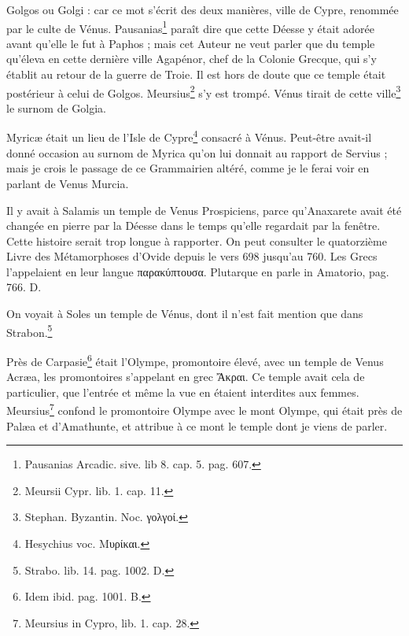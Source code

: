 \documentclass[a4paper, 18pt, oneside]{article}
\begin{document}
Golgos ou Golgi : car ce mot s'écrit des deux manières, ville de Cypre, renommée par le culte de Vénus. Pausanias\footnote{Pausanias Arcadic. sive. lib 8. cap. 5. pag. 607.} paraît dire que cette Déesse y était adorée avant qu'elle le fut à Paphos ; mais cet Auteur ne veut parler que du temple qu'éleva en cette dernière ville Agapénor, chef de la Colonie Grecque, qui s'y établit au retour de la guerre de Troie. Il est hors de doute que ce temple était postérieur à celui de Golgos. Meursius\footnote{Meursii Cypr. lib. 1. cap. 11.} s'y est trompé. Vénus tirait de cette ville\footnote{Stephan. Byzantin. Noc. γολγοί.} le surnom de Golgia.

Myricæ était un lieu de l'Isle de Cypre\footnote{Hesychius voc. Μυρίκαι.} consacré à Vénus. Peut-être avait-il donné occasion au surnom de Myrica qu'on lui donnait au rapport de Servius ; mais je crois le passage de ce Grammairien altéré, comme je le ferai voir en parlant de Venus Murcia.

Il y avait à Salamis un temple de Venus Prospiciens, parce qu'Anaxarete avait été changée en pierre par la Déesse dans le temps qu'elle regardait par la fenêtre. Cette histoire serait trop longue à rapporter. On peut consulter le quatorzième Livre des Métamorphoses d'Ovide depuis le vers 698 jusqu'au 760. Les Grecs l'appelaient en leur langue παρακύπτουσα. Plutarque en parle in Amatorio, pag. 766. D.

On voyait à Soles un temple de Vénus, dont il n'est fait mention que dans Strabon.\footnote{Strabo. lib. 14. pag. 1002. D.}

Près de Carpasie\footnote{Idem ibid. pag. 1001. B.} était l'Olympe, promontoire élevé, avec un temple de Venus Acræa, les promontoires s'appelant en grec Ἄκραι. Ce temple avait cela de particulier, que l'entrée et même la vue en étaient interdites aux femmes. Meursius\footnote{Meursius in Cypro, lib. 1. cap. 28.} confond le promontoire Olympe avec le mont Olympe, qui était près de Palæa et d'Amathunte, et attribue à ce mont le temple dont je viens de parler.
\end{document}
